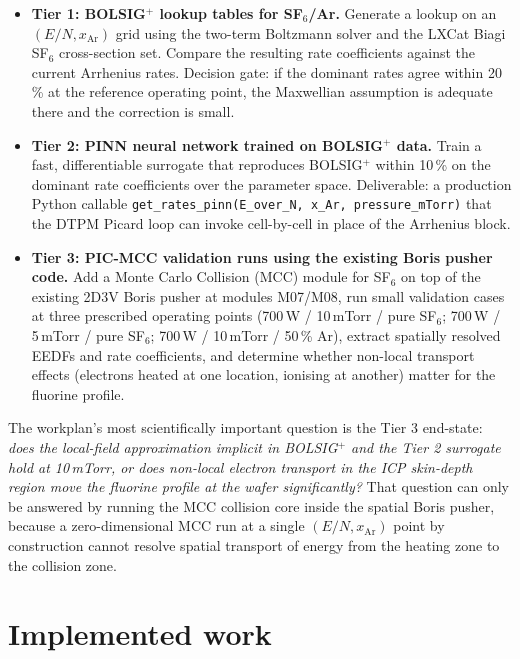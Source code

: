 \documentclass[11pt,a4paper]{article}
\newcommand{\sfsix}{SF$_6$}
\begin{document}
\begin{itemize}
  \item \textbf{Tier 1: BOLSIG$^+$ lookup tables for \sfsix{}/Ar.}
        Generate a lookup on an $(E/N, x_{\mathrm{Ar}})$ grid using
        the two-term Boltzmann solver and the LXCat Biagi \sfsix{}
        cross-section set. Compare the resulting rate coefficients
        against the current Arrhenius rates. Decision gate: if the
        dominant rates agree within 20\,\% at the reference
        operating point, the Maxwellian assumption is adequate there
        and the correction is small.
  \item \textbf{Tier 2: PINN neural network trained on BOLSIG$^+$
        data.} Train a fast, differentiable surrogate that reproduces
        BOLSIG$^+$ within 10\,\% on the dominant rate coefficients
        over the parameter space. Deliverable: a production Python
        callable \texttt{get\_rates\_pinn(E\_over\_N, x\_Ar,
        pressure\_mTorr)} that the DTPM Picard loop can invoke
        cell-by-cell in place of the Arrhenius block.
  \item \textbf{Tier 3: PIC-MCC validation runs using the existing
        Boris pusher code.} Add a Monte Carlo Collision (MCC) module
        for \sfsix{} on top of the existing 2D3V Boris pusher at
        modules M07/M08, run small validation cases at three
        prescribed operating points (700\,W / 10\,mTorr / pure
        \sfsix{}; 700\,W / 5\,mTorr / pure \sfsix{}; 700\,W /
        10\,mTorr / 50\,\% Ar), extract spatially resolved EEDFs and
        rate coefficients, and determine whether non-local transport
        effects (electrons heated at one location, ionising at
        another) matter for the fluorine profile.
\end{itemize}

The workplan's most scientifically important question is the Tier 3
end-state: \emph{does the local-field approximation implicit in
BOLSIG$^+$ and the Tier 2 surrogate hold at 10\,mTorr, or does
non-local electron transport in the ICP skin-depth region move the
fluorine profile at the wafer significantly?} That question can only
be answered by running the MCC collision core inside the spatial
Boris pusher, because a zero-dimensional MCC run at a single
$(E/N, x_{\mathrm{Ar}})$ point by construction cannot resolve
spatial transport of energy from the heating zone to the collision
zone.

\section{Implemented work}
\label{sec:built}
\end{document}
